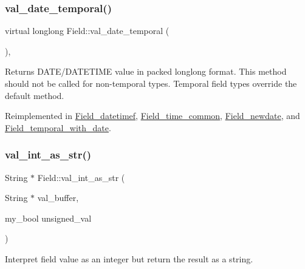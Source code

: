 \mbox{\label{classField_a85b7713df40509aaa467a75eb3945614}} 
\subsubsection{\texorpdfstring{val\+\_\+date\+\_\+temporal()}{val\_date\_temporal()}}
{\footnotesize\ttfamily virtual longlong Field\+::val\+\_\+date\+\_\+temporal (\begin{DoxyParamCaption}{ }\end{DoxyParamCaption})\hspace{0.3cm}{\ttfamily [inline]}, {\ttfamily [virtual]}}

Returns D\+A\+T\+E/\+D\+A\+T\+E\+T\+I\+ME value in packed longlong format. This method should not be called for non-\/temporal types. Temporal field types override the default method. 

Reimplemented in \mbox{\hyperlink{classField__datetimef_aec7455bda53c84017097539ac92c91d2}{Field\+\_\+datetimef}}, \mbox{\hyperlink{classField__time__common_a78d985bb5c8a86a8860bff1315839c10}{Field\+\_\+time\+\_\+common}}, \mbox{\hyperlink{classField__newdate_a06c3392cc8329a524f544360d789fc3d}{Field\+\_\+newdate}}, and \mbox{\hyperlink{classField__temporal__with__date_a3d1a5e9fb109d1da223753c6072436ab}{Field\+\_\+temporal\+\_\+with\+\_\+date}}.

\mbox{\label{classField_a180aa83c030df25313f083557b05c15b}} 
\subsubsection{\texorpdfstring{val\+\_\+int\+\_\+as\+\_\+str()}{val\_int\_as\_str()}}
{\footnotesize\ttfamily String $\ast$ Field\+::val\+\_\+int\+\_\+as\+\_\+str (\begin{DoxyParamCaption}\item[{String $\ast$}]{val\+\_\+buffer,  }\item[{my\+\_\+bool}]{unsigned\+\_\+val }\end{DoxyParamCaption})}

Interpret field value as an integer but return the result as a string.

